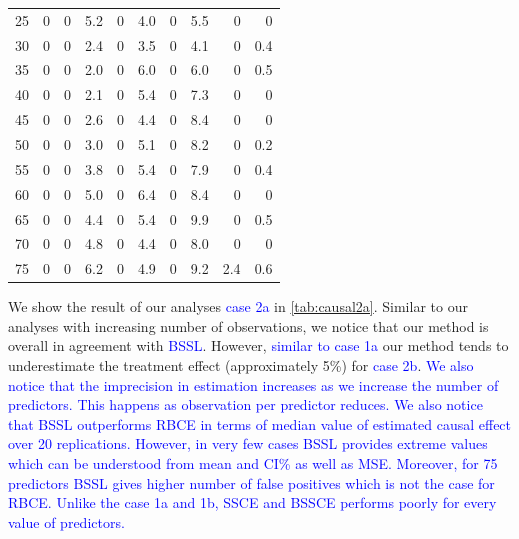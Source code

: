 \documentclass[preprint,12pt]{elsarticle}
\newcommand{\added}[1]{\textcolor{blue}{#1}}
\begin{document}
\begin{table}[ht]
\begin{tabular}{c|rrr|rr|rr|rr}
		\hline
		25 & 0 & 0 & 5.2 & 0 & 4.0 & 0 & 5.5 & 0 & 0 \\ 
		30 & 0 & 0 & 2.4 & 0 & 3.5 & 0 & 4.1 & 0 & 0.4 \\ 
		35 & 0 & 0 & 2.0 & 0 & 6.0 & 0 & 6.0 & 0 & 0.5 \\ 
		40 & 0 & 0 & 2.1 & 0 & 5.4 & 0 & 7.3 & 0 & 0 \\ 
		45 & 0 & 0 & 2.6 & 0 & 4.4 & 0 & 8.4 & 0 & 0 \\ 
		50 & 0 & 0 & 3.0 & 0 & 5.1 & 0 & 8.2 & 0 & 0.2 \\ 
		55 & 0 & 0 & 3.8 & 0 & 5.4 & 0 & 7.9 & 0 & 0.4 \\ 
		60 & 0 & 0 & 5.0 & 0 & 6.4 & 0 & 8.4 & 0 & 0 \\ 
		65 & 0 & 0 & 4.4 & 0 & 5.4 & 0 & 9.9 & 0 & 0.5 \\ 
		70 & 0 & 0 & 4.8 & 0 & 4.4 & 0 & 8.0 & 0 & 0 \\ 
		75 & 0 & 0 & 6.2 & 0 & 4.9 & 0 & 9.2 & 2.4 & 0.6 \\ 
		\hline
	\end{tabular}
\end{table}


We show the result of our analyses \added{case 2a} in \cref{tab:causal2a}. Similar to
our analyses with increasing number of observations, we notice that our method 
is overall in agreement with
\added{BSSL}. However, \added{similar to case 1a} our method tends to
underestimate the treatment effect (approximately 5\%) for \added{case 2b}. \added{We also notice that the imprecision in estimation increases as we increase the number of predictors. This happens as observation per predictor reduces. We also notice that BSSL outperforms RBCE in terms of median value of estimated causal effect over 20 replications. However, in very few cases BSSL provides extreme values which can be understood from mean and CI\% as well as MSE. Moreover, for 75 predictors BSSL gives higher number of false positives which is not the case for RBCE. Unlike the case 1a and 1b, SSCE and BSSCE performs poorly for every value of predictors.}
\end{document}
